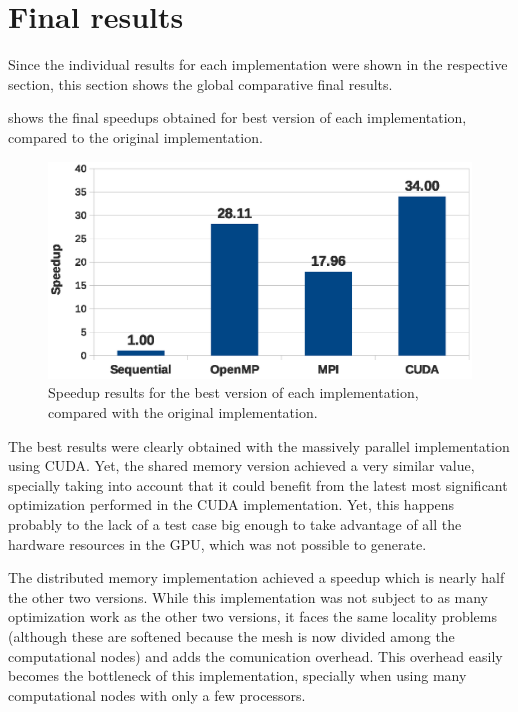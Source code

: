 \section{Final results}
\label{sec:finalresults}

Since the individual results for each implementation were shown in the respective section, this section shows the global comparative final results.

 shows the final speedups obtained for best version of each implementation, compared to the original implementation.

\begin{figure}[!htp]
	\centering
	\includegraphics[width=\columnwidth]{images/graph_comparison_all.eps}
	\caption{Speedup results for the best version of each implementation, compared with the original implementation.}
	\label{fig:results:final}
\end{figure}

The best results were clearly obtained with the massively parallel implementation using CUDA. Yet, the shared memory version achieved a very similar value, specially taking into account that it could benefit from the latest most significant optimization performed in the CUDA implementation.
Yet, this happens probably to the lack of a test case big enough to take advantage of all the hardware resources in the GPU, which was not possible to generate.

The distributed memory implementation achieved a speedup which is nearly half the other two versions.
While this implementation was not subject to as many optimization work as the other two versions, it faces the same locality problems (although these are softened because the mesh is now divided among the computational nodes) and adds the comunication overhead.
This overhead easily becomes the bottleneck of this implementation, specially when using many computational nodes with only a few processors.
